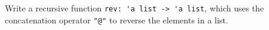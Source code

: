 Write a recursive function \mbox{\lstinline{rev: 'a list -> 'a list}}, which uses the concatenation operator \lstinline{"@"} to reverse the elements in a list.
